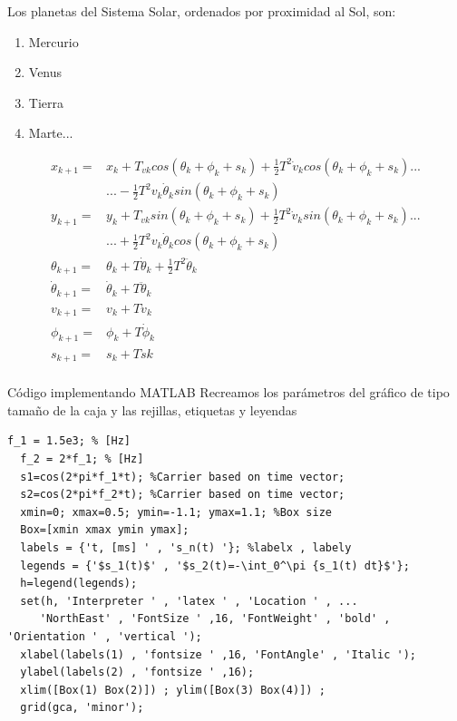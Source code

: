 \documentclass[conference,compsoc,onecolumn]{IEEEtran}
\begin{document}
Los planetas del Sistema Solar, ordenados por proximidad al Sol, son:
\begin{enumerate}
    \item Mercurio
    \item Venus
    \item Tierra
    \item Marte...
\end{enumerate}
\begin{equation}\label{eq_ej}
\begin{split} 
x_{k+1}  = & x_{k}+ T_{v k} cos(\theta_{k} + \phi_{k} + s_{k}) +\frac{1}{2}T^{2}\dot{v}_{k}cos(\theta_{k} + \phi_{k} + s_{k})...\\
& ...-\frac{1}{2}T^{2}v_{k}\dot{\theta}_{k}sin(\theta_{k} + \phi_{k} + s_{k})\\
y_{k+1} = & y_{k}+ T_{v k}sin(\theta_{k} + \phi_{k} + s_{k}) +\frac{1}{2}T^{2}\dot{v}_{k}sin(\theta_{k} + \phi_{k} + s_{k})...\\  
&...+\frac{1}{2}T^{2}v_{k}\dot{\theta}_{k}cos(\theta_{k} + \phi_{k} + s_{k})\\
\theta_{k+1}= & \theta_{k} + T \dot{\theta}_{k}+ \frac{1}{2}T^{2}\ddot{\theta}_{k}\\
\dot{\theta}_{k+1}= & \dot{\theta}_{k} + T\ddot{\theta}_{k}\\
v_{k+1}= &v_{k} + T \dot{v}_{ k}\\ 
\phi_{k+1}= &\phi_{k} + T \dot{\phi} _{k}\\ 
s_{k+1}= & s_{k} + T\dot{s} {k}\\ 
\end{split}
\end{equation}


Código implementando MATLAB Recreamos los parámetros del gráfico de tipo tamaño de la caja y las rejillas,
etiquetas y leyendas

\lstset{language=Matlab, breaklines=true, basicstyle=\footnotesize}
\lstset{numbers=left, numberstyle=\tiny, stepnumber=1, numbersep=-2pt}
\begin{lstlisting}[frame=single]
  f_1 = 1.5e3; % [Hz]
  f_2 = 2*f_1; % [Hz]
  s1=cos(2*pi*f_1*t); %Carrier based on time vector; 
  s2=cos(2*pi*f_2*t); %Carrier based on time vector; 
  xmin=0; xmax=0.5; ymin=-1.1; ymax=1.1; %Box size 
  Box=[xmin xmax ymin ymax]; 
  labels = {'t, [ms] ' , 's_n(t) '}; %labelx , labely 
  legends = {'$s_1(t)$' , '$s_2(t)=-\int_0^\pi {s_1(t) dt}$'}; 
  h=legend(legends); 
  set(h, 'Interpreter ' , 'latex ' , 'Location ' , ... 
     'NorthEast' , 'FontSize ' ,16, 'FontWeight' , 'bold' , 'Orientation ' , 'vertical '); 
  xlabel(labels(1) , 'fontsize ' ,16, 'FontAngle' , 'Italic '); 
  ylabel(labels(2) , 'fontsize ' ,16); 
  xlim([Box(1) Box(2)]) ; ylim([Box(3) Box(4)]) ; 
  grid(gca, 'minor');
\end{lstlisting}


\nocite{*}

\label{sec:biblio}
% 





\end{document}

